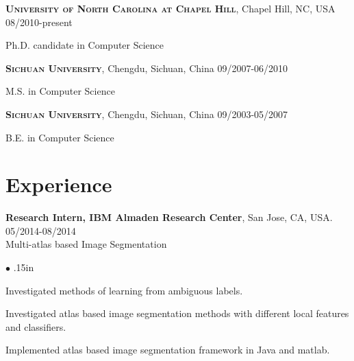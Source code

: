 \documentclass[line,margin]{res}
\newenvironment{bullets}{\begin{list}{\tiny$\bullet$}{\topsep 0pt \itemsep -2pt \leftmargin .15in}}{\vspace*{4pt}\end{list}}
\newenvironment{list1}{
  \begin{list}{\ding{113}}{%
      \setlength{\itemsep}{0in}
      \setlength{\parsep}{0in} \setlength{\parskip}{0in}
      \setlength{\topsep}{0in} \setlength{\partopsep}{0in} 
      \setlength{\leftmargin}{0.17in}}}{\end{list}}
\begin{document}
\begin{resume}
\textsc{\textbf{University of North Carolina at Chapel Hill}}, Chapel Hill, NC, USA \hfill{08/2010-present}\\
\vspace*{-.15in}
\begin{list1}
\item[] Ph.D. candidate in Computer Science %
\end{list1}
\vspace*{-.15in}
\textsc{\textbf{Sichuan University}}, Chengdu, Sichuan, China \hfill {09/2007-06/2010} \\
\vspace*{-.15in}
\begin{list1}
\item[] M.S. in Computer Science  %
\end{list1}
\vspace*{-.15in}
\textsc{\textbf{Sichuan University}}, Chengdu, Sichuan, China \hfill{09/2003-05/2007}\\
\vspace*{-.15in}
\begin{list1}
\item[] B.E. in Computer Science  %
\end{list1}

\vspace{-.05in}
\section{\sc Experience}
\smallskip


\textbf{Research Intern, IBM Almaden Research Center}, San Jose, CA, USA. \hfill      05/2014-08/2014 \\
Multi-atlas based Image Segmentation
\begin{bullets} 
\item Investigated methods of learning from ambiguous labels.
\item Investigated atlas based image segmentation methods with different local features and classifiers.
\item Implemented atlas based image segmentation framework in Java and matlab.
\end{bullets}
\vspace{-.1in}


\end{resume}
\end{document}
